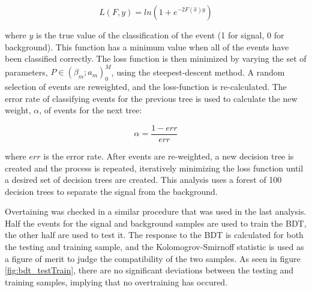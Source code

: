 \begin{equation}\label{eq:bdt_loss_function}
L(F,y) = ln\left( 1+ e^{-2F(\hat{x})y}\right)
\end{equation}

\noindent where $y$ is the true value of the classification of the
event (1 for signal, 0 for background).  This function has a minimum
value when all of the events have been classified correctly.  The loss
function is then minimized by varying the set of parameters,
$P\in(\beta_{m};a_{m})_{0}^{M}$, using the steepest-descent method.  A
random selection of events are reweighted, and the loss-function is
re-calculated.  The error rate of classifying events for the previous
tree is used to calculate the new weight, $\alpha$, of events for the
next tree: 

\begin{equation}\label{bdt_event_reweight}
\alpha = \frac{1-err}{err}
\end{equation}

\noindent where $err$ is the error rate.  After events are
re-weighted, a new decision tree is created and the process is
repeated, iteratively minimizing the loss function until a desired set
of decision trees are created.  This analysis uses a forest of 100
decision trees to separate the \ttH signal from the \ttjets
background.  

\par  Overtaining was checked in a similar procedure that was used in
the last analysis.  Half the events for the signal and background
samples are used to train the BDT, the other half are used to test
it.  The response to the BDT is calculated for both the testing and
training sample, and the Kolomogrov-Smirnoff statistic is used as a
figure of merit to judge the compatibility of the two samples.  As
seen in figure \ref{fig:bdt_testTrain}, there are no significant
deviations between  the testing and training samples, implying that no
overtraining has occured.  

